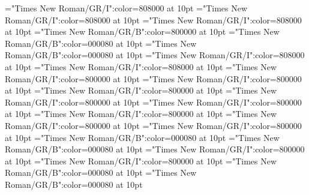 \documentclass[a4paper,twoside]{article}
\begin{document}
\font\comentariorestrictivosensesensecontentsensesmainentrycomplex="Times New Roman/GR/I":color=808000 at 10pt
\font{}="Times New Roman/GR/I":color=808000 at 10pt
\font\scientificnamesensesensecontentsensesmainentrycomplex="Times New Roman/GR/I":color=808000 at 10pt
\font\sensenumbersensecontentsensessensesensecontentsensesmainentrycomplex="Times New Roman/GR/B":color=800000 at 10pt
\font\spanmxbexampleexamplescontentssensesensecontentsensesmainentrycomplex="Times New Roman/GR/B":color=000080 at 10pt
\font\spanexampleexamplescontentssensesensecontentsensesmainentrycomplex="Times New Roman/GR/B":color=000080 at 10pt
\font\spanesencyclopedicinfosensesensecontentsensesmainentrycomplex="Times New Roman/GR/I":color=808000 at 10pt
\font\spanencyclopedicinfosensesensecontentsensesmainentrycomplex="Times New Roman/GR/I":color=808000 at 10pt
\font\spanesreverseabbrcomplexformtypescomplexformentryrefsmainentrycomplex="Times New Roman/GR/I":color=800000 at 10pt
\font\spanreverseabbrcomplexformtypescomplexformentryrefsmainentrycomplex="Times New Roman/GR/I":color=800000 at 10pt
\font\spanmxbheadwordreferencedentryreferencedentriescomplexformentryrefsmainentrycomplex="Times New Roman/GR/I":color=800000 at 10pt
\font\spanheadwordreferencedentryreferencedentriescomplexformentryrefsmainentrycomplex="Times New Roman/GR/I":color=800000 at 10pt
\font\spanescommentmainentrycomplex="Times New Roman/GR/I":color=800000 at 10pt
\font\spancommentmainentrycomplex="Times New Roman/GR/I":color=800000 at 10pt
\font\spanesabbreviationvariantentrytypevariantentrytypesvariantformentrybackrefsmainentrycomplex="Times New Roman/GR/I":color=800000 at 10pt
\font\spanabbreviationvariantentrytypevariantentrytypesvariantformentrybackrefsmainentrycomplex="Times New Roman/GR/I":color=800000 at 10pt
\font\spanmxbheadwordvariantformentrybackrefvariantformentrybackrefsmainentrycomplex="Times New Roman/GR/B":color=000080 at 10pt
\font\spanheadwordvariantformentrybackrefvariantformentrybackrefsmainentrycomplex="Times New Roman/GR/B":color=000080 at 10pt
\font\spanesabbreviationvariantentrytypevariantentrytypesvariantformentrybackrefsbmainentrycomplex="Times New Roman/GR/I":color=800000 at 10pt
\font\spanabbreviationvariantentrytypevariantentrytypesvariantformentrybackrefsbmainentrycomplex="Times New Roman/GR/I":color=800000 at 10pt
\font\spanmxbheadwordvariantformentrybackrefbvariantformentrybackrefsbmainentrycomplex="Times New Roman/GR/B":color=000080 at 10pt
\font\spanheadwordvariantformentrybackrefbvariantformentrybackrefsbmainentrycomplex="Times New Roman/GR/B":color=000080 at 10pt
\end{document}
